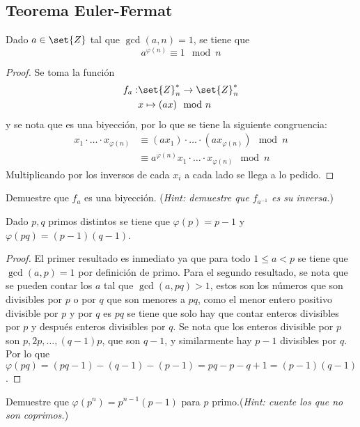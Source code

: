 \documentclass{ayudantia}
\begin{document}
\subsection{Teorema Euler-Fermat}
\begin{thm}
    Dado \(a\in\set{Z}\) tal que \(\gcd(a,n)=1\), se tiene que
    \begin{equation*}
        a^{\varphi(n)}\equiv1\mod n
    \end{equation*}
\end{thm}
\begin{proof}
    Se toma la función
    \begin{align*}
        f_a:&\set{Z}_n^*\rightarrow\set{Z}_n^*\\
        &x\mapsto (ax)\mod n
    \end{align*}
    y se nota que es una biyección, por lo que se tiene la siguiente congruencia:
    \begin{align*}
        x_1\cdot\ldots\cdot x_{\varphi(n)}&\equiv (ax_1)\cdot\ldots\cdot (ax_{\varphi(n)})\mod n\\
        &\equiv a^{\varphi(n)}x_1\cdot\ldots\cdot x_{\varphi(n)}\mod n
    \end{align*}
    Multiplicando por los inversos de cada \(x_i\) a cada lado se llega a lo pedido.
\end{proof}
\begin{prob}
    Demuestre que \(f_a\) es una biyección. (\textit{Hint: demuestre que \(f_{a^{-1}}\) es su inversa.})
\end{prob}
\begin{thm}
    Dado \(p,q\) primos distintos se tiene que \(\varphi(p)=p-1\) y \(\varphi(pq)=(p-1)(q-1)\).
\end{thm}
\begin{proof}
    El primer resultado es inmediato ya que para todo \(1\leq a<p\) se tiene que \(\gcd(a,p)=1\) por definición de primo. Para el segundo resultado, se nota que se pueden contar los \(a\) tal que \(\gcd(a,pq)>1\), estos son los números que son divisibles por \(p\) o por \(q\) que son menores a \(pq\), como el menor entero positivo divisible  por \(p\) y por \(q\) es \(pq\) se tiene que solo hay que contar enteros divisibles por \(p\) y después enteros divisibles por \(q\). Se nota que los enteros divisible por \(p\) son \(p,2p,\ldots, (q-1)p\), que son \(q-1\), y similarmente hay \(p-1\) divisibles por \(q\). Por lo que \(\varphi(pq)=(pq-1)-(q-1)-(p-1)=pq-p-q+1=(p-1)(q-1)\).
\end{proof}
\begin{prob}
    Demuestre que \(\varphi(p^n)=p^{n-1}(p-1)\) para \(p\) primo.(\textit{Hint: cuente los que no son coprimos.})
\end{prob}
\end{document}
